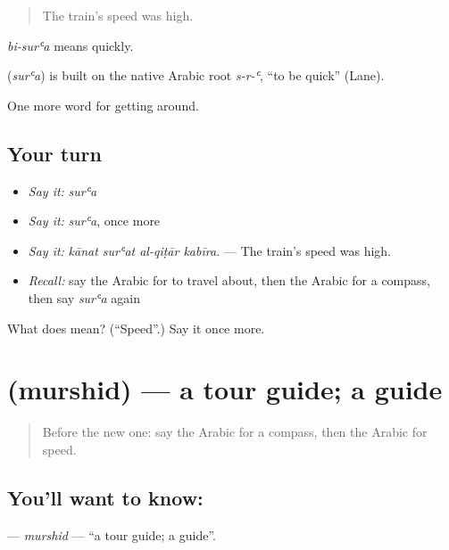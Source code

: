 \begin{quote}
The train's speed was high.
\end{quote}

\emph{bi-surʿa} means quickly.

\begin{cousinweb}
\textbf{} (\emph{surʿa}) is built on the native Arabic root \emph{s-r-ʿ}, \textquotedblleft{}to be quick\textquotedblright{} (Lane).
\end{cousinweb}

\begin{grammarlens}[title={What you've built}]
One more word for getting around.
\end{grammarlens}

\subsection*{Your turn}
\begin{itemize}
\raggedright
  \item \emph{Say it:} \emph{surʿa}
  \item \emph{Say it:} \emph{surʿa}, once more
  \item \emph{Say it:} \emph{kānat surʿat al-qiṭār kabīra.} — The train's speed was high.
  \item \emph{Recall:} say the Arabic for to travel about, then the Arabic for a compass, then say \emph{surʿa} again
\end{itemize}

\begin{tcolorbox}[breakable,colback=teal!4,colframe=teal!35!black,title={Before you move on}]
What does  mean? (\textquotedblleft{}Speed\textquotedblright{}.) Say it once more.
\end{tcolorbox}
\section[\texorpdfstring{\ar{مرشد} (murshid)}{مرشد (murshid)}]{ (murshid) — a tour guide; a guide}

\label{lesson:AR-C437-murshid}



\begin{quote}
Before the new one: say the Arabic for a compass, then the Arabic for speed.
\end{quote}

\subsection*{You'll want to know: }
\textbf{} — \emph{murshid} — \textquotedblleft{}a tour guide; a guide\textquotedblright{}.

